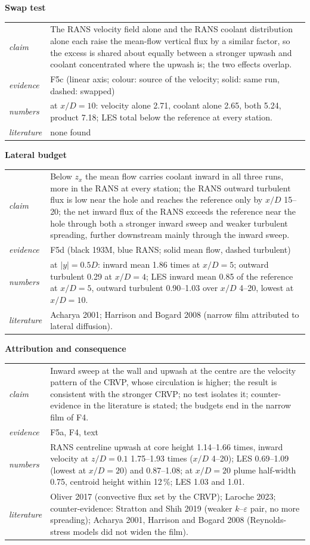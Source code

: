 \documentclass[10pt]{article}
\makeatletter
\newcommand{\blk}[5]{\textbf{#1}\par
\begin{tabularx}{\textwidth}{@{}>{\itshape}l X@{}}
claim & #2\\ evidence & #3\\ numbers & #4\\ literature & #5\\
\end{tabularx}\par\smallskip}
\makeatother
\begin{document}
\blk{Swap test}{The RANS velocity field alone and the RANS coolant distribution alone each raise the mean-flow
vertical flux by a similar factor, so the excess is shared about equally between a stronger upwash and coolant
concentrated where the upwash is; the two effects overlap.}{F5c (linear axis; colour: source of the
velocity; solid: same run, dashed: swapped)}{at $x/D=10$: velocity alone 2.71, coolant alone 2.65, both 5.24, product
7.18; LES total below the reference at every station.}{none found}

\blk{Lateral budget}{Below $z_x$ the mean flow carries coolant inward in all three runs, more in the RANS at every
station; the RANS outward turbulent flux is low near the hole and reaches the reference only by $x/D$ 15--20; the
net inward flux of the RANS exceeds the reference near the hole through both a stronger inward sweep and weaker
turbulent spreading, further downstream mainly through the inward sweep.}{F5d (black 193M, blue RANS; solid mean
flow, dashed turbulent)}{at $|y|=0.5D$: inward mean 1.86 times at $x/D=5$; outward turbulent 0.29 at $x/D=4$; LES
inward mean 0.85 of the reference at $x/D=5$, outward turbulent 0.90--1.03 over $x/D$ 4--20, lowest at
$x/D=10$.}{Acharya 2001; Harrison and Bogard 2008 (narrow film attributed to lateral
diffusion).}

\blk{Attribution and consequence}{Inward sweep at the wall and upwash at the centre are the velocity pattern of the
CRVP, whose circulation is higher; the result is consistent with the stronger CRVP; no test isolates it;
counter-evidence in the literature is stated; the budgets end in the narrow film of F4.}{F5a, F4, text}{RANS centreline upwash at core height 1.14--1.66
times, inward velocity at $z/D=0.1$ 1.75--1.93 times ($x/D$ 4--20); LES 0.69--1.09 (lowest at $x/D=20$) and
0.87--1.08; at $x/D=20$ plume half-width 0.75, centroid height within 12\,\%; LES 1.03 and 1.01.}{Oliver 2017 (convective flux set by the CRVP); Laroche 2023; counter-evidence: Stratton and
Shih 2019 (weaker $k$--$\varepsilon$ pair, no more spreading); Acharya 2001, Harrison and Bogard 2008 (Reynolds-stress
models did not widen the film).}
\end{document}
